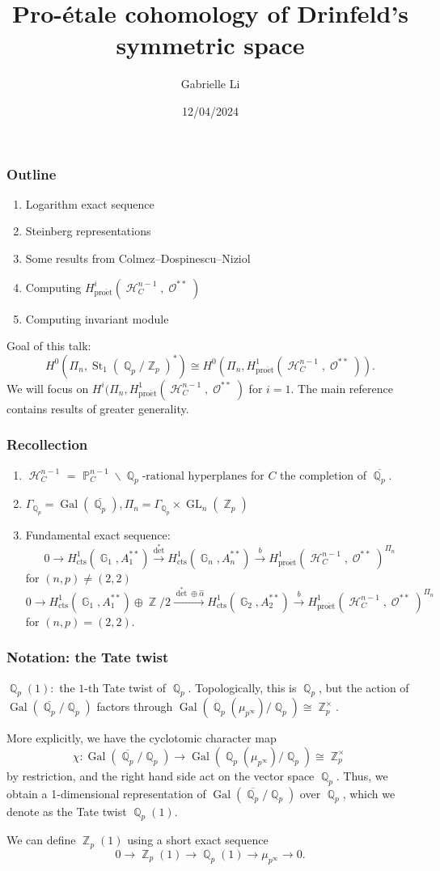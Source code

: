\documentclass{beamer}
\title{Pro-\'etale cohomology of Drinfeld's symmetric space}
\author{Gabrielle Li}
\institute{UIUC Arithmetic and chromatic learning seminar}
\date{12/04/2024}
\theoremstyle{definition}
\newcommand{\pet}{\operatorname{pro\acute{e}t}}
\newcommand{\Gal}{\operatorname{Gal}}
\newcommand{\St}{\operatorname{St}}
\newcommand{\GL}{\operatorname{GL}}
\newcommand{\cts}{\operatorname{cts}}
\newcommand{\OO}{\operatorname{\mathcal{O}}}
\newcommand{\ZZ}{\operatorname{\mathbb{Z}}}
\newcommand{\QQ}{\operatorname{\mathbb{Q}}}
\newcommand{\PP}{\operatorname{\mathbb{P}}}
\newcommand{\GG}{\operatorname{\mathbb{G}}}
\newcommand{\HH}{\operatorname{\mathcal{H}}}
\begin{document}
\frame{\titlepage}

\begin{frame}
\frametitle{Outline}
\begin{enumerate}
\item Logarithm exact sequence
\item Steinberg representations
\item Some results from Colmez--Dospinescu--Niziol
\item Computing $H^i_{\pet}(\HH_C^{n - 1}, \OO^{**})$
\item Computing invariant module
\end{enumerate}
Goal of this talk: $$H^0(\Pi_n, \St_1(\QQ_p/\ZZ_p)^*) \cong H^0(\Pi_n, H^1_{\pet}(\HH_C^{n - 1}, \OO^{**})).$$
We will focus on $H^i(\Pi_n, H^1_{\pet}(\HH_C^{n - 1}, \OO^{**})$ for $i = 1$. The main reference \cite{24} contains results of greater generality.
\end{frame}

\begin{frame}
\frametitle{Recollection}
\begin{enumerate}
\item $\HH^{n - 1}_C$ = $\PP_C^{n - 1}\backslash\QQ_p\text{-rational hyperplanes}$ for $C$ the completion of $\overline{\QQ_p}$.
\item $\Gamma_{\QQ_p} = \Gal(\overline{\QQ_p}), \Pi_n = \Gamma_{\QQ_p} \times \GL_n(\ZZ_p)$
\item Fundamental exact sequence: 
$$0 \to H^1_{\cts}(\GG_1, A_1^{**}) \xrightarrow{\det^*} H^1_{\cts}(\GG_n, A_n^{**}) \xrightarrow{b} H^1_{\pet}(\HH^{n - 1}_C, \OO^{**})^{\Pi_n}$$for $(n ,p) \neq (2, 2)$
$$0 \to H^1_{\cts}(\GG_1, A_1^{**}) \oplus \ZZ/2 \xrightarrow{\det^* \oplus \hat{\alpha}} H^1_{\cts}(\GG_2, A_2^{**}) \xrightarrow{b} H^1_{\pet}(\HH^{n - 1}_C, \OO^{**})^{\Pi_n}$$for $(n ,p) = (2, 2)$.
	
\end{enumerate}

\end{frame}

\begin{frame}

\frametitle{Notation: the Tate twist}
$\QQ_p(1): $ the $1$-th Tate twist of $\QQ_p$. Topologically, this is $\QQ_p$, but the action of $\Gal(\overline{\QQ_p}/\QQ_p)$ factors through $\Gal(\QQ_p(\mu_{p^\infty})/\QQ_p) \cong \ZZ_p^\times$.

More explicitly, we have the cyclotomic character map $$\chi: \Gal(\overline{\QQ_p}/\QQ_p) \to  \Gal(\QQ_p(\mu_{p^\infty})/\QQ_p) \cong \ZZ_p^\times$$ by restriction, and the right hand side act on the vector space $\QQ_p$. Thus, we obtain a 1-dimensional representation of $\Gal(\overline{\QQ_p}/\QQ_p)$ over $\QQ_p$, which we denote as the Tate twist $\QQ_p(1)$. 

We can define $\ZZ_p(1)$ using a short exact sequence \begin{equation} \label{Zpi}
 	0 \to \ZZ_p(1) \to \QQ_p(1) \to \mu_{p^\infty} \to 0.
 \end{equation}
\end{frame}
\end{document}
